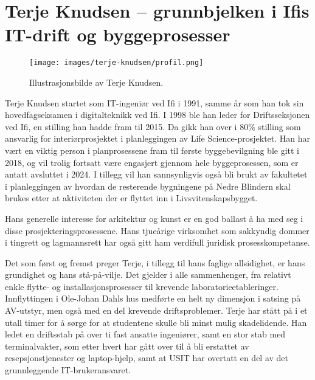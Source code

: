 \chapter[Terje Knudsen]{Terje Knudsen – grunnbjelken i Ifis IT-drift og byggeprosesser}

\author{Skrevet av Narve Trædal}

\begin{wrapfigure}{r}{6.5cm}
	\centering
	\texttt{[image: images/terje-knudsen/profil.png]}
	\label{fig:terje-knudsen}
	\caption{Illustrasjonsbilde av Terje Knudsen.}
\end{wrapfigure}

Terje Knudsen startet som IT-ingeniør ved Ifi i 1991, samme år som han tok sin hovedfagseksamen i digitalteknikk ved Ifi. I 1998 ble han leder for Driftsseksjonen ved Ifi, en stilling han hadde fram til 2015. Da gikk han over i 80\% stilling som ansvarlig for interiørprosjektet i planleggingen av Life
Science-prosjektet. Han har vært en viktig person i planprosessene fram til første byggebevilgning ble gitt i 2018, og vil trolig fortsatt være engasjert gjennom hele byggeprosessen, som er antatt avsluttet i 2024. I tillegg vil han sannsynligvis også bli brukt av fakultetet i planleggingen av hvordan
de resterende bygningene på Nedre Blindern skal brukes etter at aktiviteten der er flyttet inn i Livsvitenskapsbygget.

Hans generelle interesse for arkitektur og kunst er en god ballast å ha med seg i disse prosjekteringsprosessene. Hans tjueårige virksomhet som sakkyndig dommer i tingrett og lagmannsrett har også gitt ham verdifull juridisk prosesskompetanse.

Det som først og fremst preger Terje, i tillegg til hans faglige allsidighet, er hans grundighet og hans stå-på-vilje. Det gjelder i alle sammenhenger, fra relativt enkle flytte- og installasjonsprosesser til krevende laboratorieetableringer. Innflyttingen i Ole-Johan Dahls hus medførte en helt ny dimensjon i satsing på AV-utstyr, men også med en del krevende driftsproblemer. Terje har stått på i et utall timer for å sørge for at studentene skulle bli minst mulig skadelidende. Han ledet en driftsstab på over ti fast ansatte ingeniører, samt en stor stab med terminalvakter, som etter hvert
har gått over til å bli erstattet av resepsjonstjenester og laptop-hjelp, samt at USIT har overtatt en del av det grunnleggende IT-brukeransvaret.

